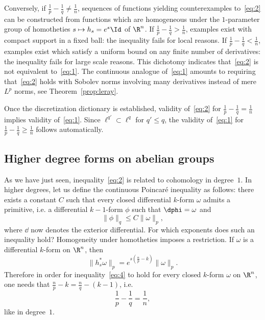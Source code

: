 Conversely, if $\frac{1}{p}-\frac{1}{q}\not=\frac{1}{n}$, sequences of functions yielding counterexamples to~\eqref{eq:2} can be constructed from functions which are homogeneous under the $1$-parameter group of homotheties $s\mapsto h_s=e^{s}\Id$ of $\R^n$. If $\frac{1}{p}-\frac{1}{q}>\frac{1}{n}$, examples exist with compact support in a fixed ball: the inequality fails for local reasons. If $\frac{1}{p}-\frac{1}{q}<\frac{1}{n}$, examples exist which satisfy a uniform bound on any finite number of derivatives: the inequality fails for large scale reasons. This dichotomy indicates that~\eqref{eq:2} is not equivalent to~\eqref{eq:1}. The continuous analogue of~\eqref{eq:1} amounts to requiring that~\eqref{eq:2} holds with Sobolev norms involving many derivatives instead of mere $L^p$ norms, see Theorem~\ref{prop:leray}.

Once the discretization dictionary is established, validity of~\eqref{eq:2} for $\frac{1}{p}-\frac{1}{q}=\frac{1}{n}$ implies validity of~\eqref{eq:1}. Since $\ell^{q'}\subset \ell^{q}$ for $q'\leq q$, the validity of~\eqref{eq:1} for $\frac{1}{p}-\frac{1}{q}\geq\frac{1}{n}$ follows automatically.

\subsection{Higher degree forms on abelian groups}

As we have just seen, inequality~\eqref{eq:2} is related to cohomology in degree~$1$. In higher degrees, let us define the continuous Poincar\'e inequality as follows: there exists a constant $C$ such that every closed differential $k$-form $\omega$ admits a primitive, i.e. a differential $k-1$-form $\phi$ such that $\dphi=\omega$ and
\begin{equation}\label{eq:4}
\|\phi\|_q \leq C \|\omega\|_p,
\end{equation}
where $\dd$ now denotes the exterior differential. For which exponents does such an inequality hold? Homogeneity under homotheties imposes a restriction. If $\omega$ is a differential $k$-form on $\R^n$, then
\begin{equation}\label{eq:5}
\|h_s^*\omega\|_p=e^{s(\frac{n}{p}-k)}\|\omega\|_p.
\end{equation}
Therefore in order for inequality~\eqref{eq:4} to hold for every closed $k$-form $\omega$ on $\R^n$, one needs that $\frac{n}{p}-k=\frac{n}{q}-(k-1)$, i.e.
\begin{equation*}
\frac{1}{p}-\frac{1}{q}=\frac{1}{n},
\end{equation*}
like in degree~$1$.

